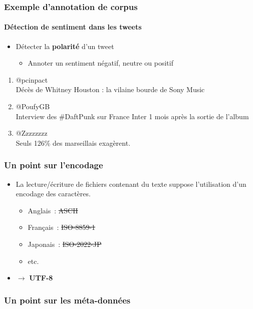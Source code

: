 
\begin{frame}
\frametitle{Exemple d'annotation de corpus}
\framesubtitle{Détection de sentiment dans les tweets}

\begin{itemize}
    \item Détecter la \textbf{polarité} d'un tweet
    \begin{itemize}
        \item Annoter un sentiment négatif, neutre ou positif
    \end{itemize}
\end{itemize}

\begin{enumerate} \itemsep5pt
    \item @pcinpact  \\
          Décès de Whitney Houston : la vilaine bourde de Sony Music

    \item @PoufyGB  \\
          Interview des \#DaftPunk sur France Inter 1 mois après la sortie 
          de l'album

    \item @Zzzzzzzz  \\
          Seuls 126\% des marseillais exagèrent.
\end{enumerate}

\end{frame}


\begin{frame}
\frametitle{Un point sur l'encodage}

\begin{itemize} \itemsep10pt
    \item La lecture/écriture de fichiers contenant du texte suppose 
         l'utilisation d'un encodage des caractères.
    \begin{itemize}
        \item Anglais~: \sout<2>{ASCII}
        \item Français~: \sout<2>{ISO-8859-1}
        \item Japonais~: \sout<2>{ISO-2022-JP}
        \item etc.
    \end{itemize}

    \huge

    \item<2>[] \alert{$\to$ \textbf{UTF-8}}

\end{itemize}

\end{frame}


\begin{frame}
\frametitle{Un point sur les méta-données}

\end{frame}


